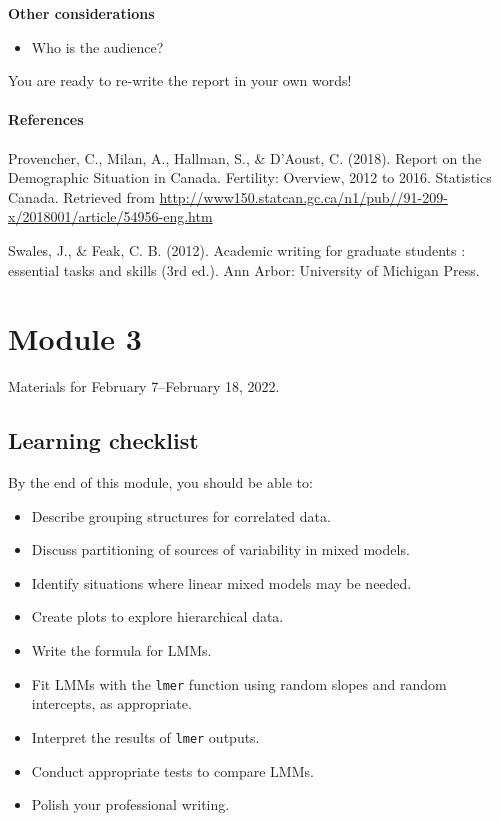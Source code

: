 \documentclass[
  openany]{book}
\providecommand{\tightlist}{%
  \setlength{\itemsep}{0pt}\setlength{\parskip}{0pt}}
\newenvironment{yellowbox}{
  \definecolor{shadecolor}{rgb}{254,187,67}  %
  \color{black}
  \begin{shaded}}
 {\end{shaded}}
\begin{document}
\textbf{Other considerations}

\begin{itemize}
\tightlist
\item
  Who is the audience?
\end{itemize}

You are ready to re-write the report in your own words!

\hypertarget{pararef}{%
\subsubsection{References}\label{pararef}}

Provencher, C., Milan, A., Hallman, S., \& D'Aoust, C. (2018). Report on the Demographic Situation in Canada. Fertility: Overview, 2012 to 2016. Statistics Canada. Retrieved from \url{http://www150.statcan.gc.ca/n1/pub//91-209-x/2018001/article/54956-eng.htm}

Swales, J., \& Feak, C. B. (2012). Academic writing for graduate students : essential tasks and skills (3rd ed.). Ann Arbor: University of Michigan Press.

\hypertarget{m3}{%
\chapter{Module 3}\label{m3}}

\begin{yellowbox}
Materials for February 7--February 18, 2022.

\end{yellowbox}

\hypertarget{learning-checklist-2}{%
\section{Learning checklist}\label{learning-checklist-2}}

By the end of this module, you should be able to:

\begin{itemize}
\tightlist
\item
  Describe grouping structures for correlated data.
\item
  Discuss partitioning of sources of variability in mixed models.
\item
  Identify situations where linear mixed models may be needed.
\item
  Create plots to explore hierarchical data.
\item
  Write the formula for LMMs.
\item
  Fit LMMs with the \texttt{lmer} function using random slopes and random intercepts, as appropriate.
\item
  Interpret the results of \texttt{lmer} outputs.
\item
  Conduct appropriate tests to compare LMMs.
\item
  Polish your professional writing.
\end{itemize}
\end{document}

